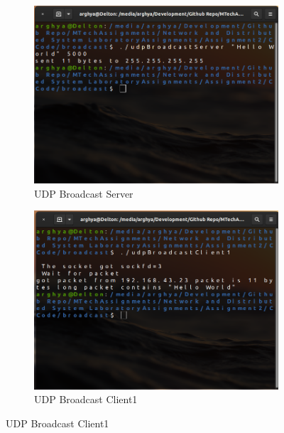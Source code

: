 \documentclass{article}
\begin{document}
\begin{enumerate}

\pagebreak

\pagebreak

\pagebreak

\begin{figure}[h]
\begin{subfigure}{.5\textwidth}
\includegraphics[width=350pt]{Output001}
\caption{UDP Broadcast Server}
\label{UDPBroadcastServer}
\end{subfigure}
\begin{subfigure}{.5\textwidth}
\includegraphics[width=350pt]{Output003}
\caption{UDP Broadcast Client1}
\label{UDPBroadcastClient1}
\end{subfigure}
\end{figure}


\end{enumerate}
\end{document}
